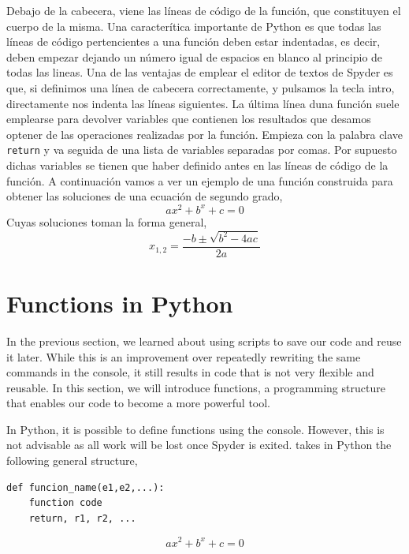 \begin{paracol}{2}
Debajo de la cabecera, viene las líneas de código de la función, que constituyen el cuerpo de la misma. Una caracterítica importante de Python es que todas las líneas de código pertencientes a una función deben estar indentadas, es decir, deben empezar dejando un número igual de espacios en blanco al principio de todas las lineas. Una de las ventajas de emplear el editor de textos de Spyder es que, si definimos una línea de cabecera correctamente,  y pulsamos la tecla intro, directamente nos indenta las líneas siguientes. La última línea duna función suele emplearse para devolver variables que contienen los resultados que desamos optener de las operaciones realizadas por la función. Empieza con la palabra clave \texttt{return} y va seguida de una lista de variables separadas por comas. Por supuesto dichas variables se tienen que haber definido antes en las líneas de código de la función. A continuación vamos a ver un ejemplo de una función construida para obtener las soluciones de una ecuación de segundo grado,
\begin{equation*}
    ax^2+b^x+c = 0
\end{equation*}
Cuyas soluciones toman la forma general,
\begin{equation*}
    x_{1,2} = \frac{-b\pm \sqrt{b^2-4ac}}{2a}
\end{equation*}
\switchcolumn
\section{Functions in Python} 
In the previous section, we learned about using scripts to save our code and reuse it later. While this is an improvement over repeatedly rewriting the same commands in the console, it still results in code that is not very flexible and reusable. In this section, we will introduce functions, a programming structure that enables our code to become a more powerful tool.

In Python, it is possible to define functions using the console. However, this is not advisable as all work will be lost once Spyder is exited. takes in Python the following general structure,

\begin{verbatim}
def funcion_name(e1,e2,...):
    function code
    return, r1, r2, ...
\end{verbatim}
\begin{equation*}
    ax^2+b^x+c = 0
\end{equation*}


\end{paracol}
